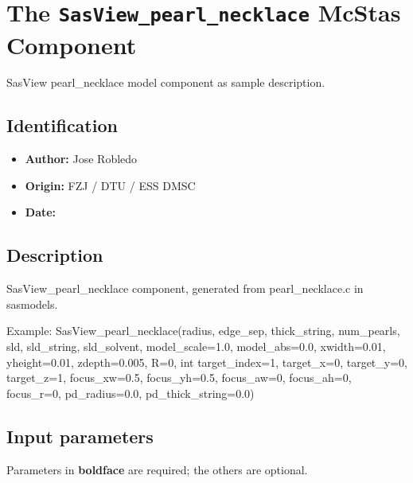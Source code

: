 \section{The \texttt{SasView\_pearl\_necklace} McStas Component}
SasView pearl\_necklace model component as sample description.

\subsection*{Identification}
\begin{itemize}
  \item \textbf{Author:} Jose Robledo
  \item \textbf{Origin:} FZJ / DTU / ESS DMSC
  \item \textbf{Date:} 
\end{itemize}

\subsection*{Description}
SasView\_pearl\_necklace component, generated from pearl\_necklace.c in sasmodels.

Example: SasView\_pearl\_necklace(radius, edge\_sep, thick\_string, num\_pearls, sld, sld\_string, sld\_solvent, model\_scale=1.0, model\_abs=0.0, xwidth=0.01, yheight=0.01, zdepth=0.005, R=0, int target\_index=1, target\_x=0, target\_y=0, target\_z=1, focus\_xw=0.5, focus\_yh=0.5, focus\_aw=0, focus\_ah=0, focus\_r=0, pd\_radius=0.0, pd\_thick\_string=0.0)

\subsection*{Input parameters}
Parameters in \textbf{boldface} are required; the others are optional.

